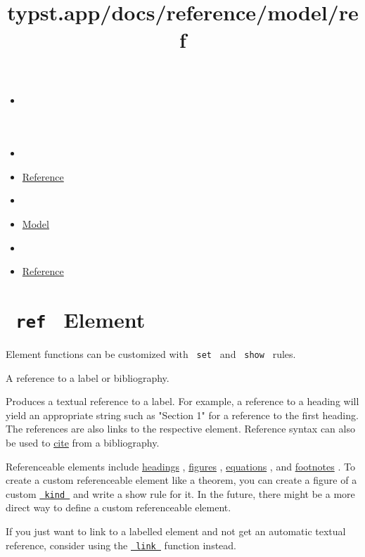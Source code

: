 \title{typst.app/docs/reference/model/ref}

\begin{itemize}
\tightlist
\item
  \href{/docs}{}
\item
  
\item
  \href{/docs/reference/}{Reference}
\item
  
\item
  \href{/docs/reference/model/}{Model}
\item
  
\item
  \href{/docs/reference/model/ref/}{Reference}
\end{itemize}

\section{\texorpdfstring{\texttt{\ ref\ } {{ Element
}}}{ ref   Element }}\label{summary}

\label{element-tooltip}
Element functions can be customized with \texttt{\ set\ } and
\texttt{\ show\ } rules.

A reference to a label or bibliography.

Produces a textual reference to a label. For example, a reference to a
heading will yield an appropriate string such as "Section 1" for a
reference to the first heading. The references are also links to the
respective element. Reference syntax can also be used to
\href{/docs/reference/model/cite/}{cite} from a bibliography.

Referenceable elements include
\href{/docs/reference/model/heading/}{headings} ,
\href{/docs/reference/model/figure/}{figures} ,
\href{/docs/reference/math/equation/}{equations} , and
\href{/docs/reference/model/footnote/}{footnotes} . To create a custom
referenceable element like a theorem, you can create a figure of a
custom
\href{/docs/reference/model/figure/\#parameters-kind}{\texttt{\ kind\ }}
and write a show rule for it. In the future, there might be a more
direct way to define a custom referenceable element.

If you just want to link to a labelled element and not get an automatic
textual reference, consider using the
\href{/docs/reference/model/link/}{\texttt{\ link\ }} function instead.

